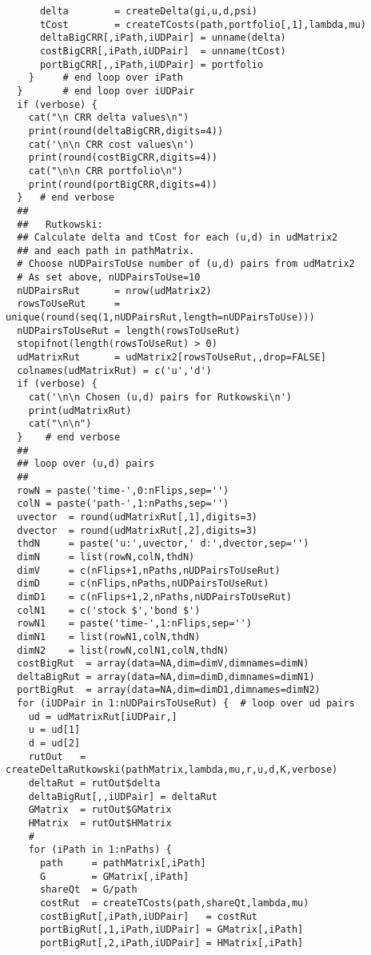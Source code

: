 \documentclass[10pt]{article}
\begin{document}
\begin{verbatim}
      delta        = createDelta(gi,u,d,psi)
      tCost        = createTCosts(path,portfolio[,1],lambda,mu)
      deltaBigCRR[,iPath,iUDPair] = unname(delta)
      costBigCRR[,iPath,iUDPair]  = unname(tCost)
      portBigCRR[,,iPath,iUDPair] = portfolio
    }     # end loop over iPath
  }       # end loop over iUDPair
  if (verbose) {
    cat("\n CRR delta values\n")
    print(round(deltaBigCRR,digits=4))
    cat('\n\n CRR cost values\n')
    print(round(costBigCRR,digits=4))
    cat("\n\n CRR portfolio\n")
    print(round(portBigCRR,digits=4))
  }   # end verbose
  ##
  ##   Rutkowski:
  ## Calculate delta and tCost for each (u,d) in udMatrix2
  ## and each path in pathMatrix.
  # Choose nUDPairsToUse number of (u,d) pairs from udMatrix2
  # As set above, nUDPairsToUse=10
  nUDPairsRut      = nrow(udMatrix2)
  rowsToUseRut     = unique(round(seq(1,nUDPairsRut,length=nUDPairsToUse)))
  nUDPairsToUseRut = length(rowsToUseRut)
  stopifnot(length(rowsToUseRut) > 0)
  udMatrixRut      = udMatrix2[rowsToUseRut,,drop=FALSE]
  colnames(udMatrixRut) = c('u','d')
  if (verbose) {
    cat('\n\n Chosen (u,d) pairs for Rutkowski\n')
    print(udMatrixRut)
    cat("\n\n")
  }    # end verbose
  ##
  ## loop over (u,d) pairs
  ##
  rowN = paste('time-',0:nFlips,sep='')
  colN = paste('path-',1:nPaths,sep='')
  uvector  = round(udMatrixRut[,1],digits=3)
  dvector  = round(udMatrixRut[,2],digits=3)
  thdN     = paste('u:',uvector,' d:',dvector,sep='')
  dimN     = list(rowN,colN,thdN)
  dimV     = c(nFlips+1,nPaths,nUDPairsToUseRut)
  dimD     = c(nFlips,nPaths,nUDPairsToUseRut)
  dimD1    = c(nFlips+1,2,nPaths,nUDPairsToUseRut)
  colN1    = c('stock $','bond $')
  rowN1    = paste('time-',1:nFlips,sep='')
  dimN1    = list(rowN1,colN,thdN)
  dimN2    = list(rowN,colN1,colN,thdN)
  costBigRut  = array(data=NA,dim=dimV,dimnames=dimN)
  deltaBigRut = array(data=NA,dim=dimD,dimnames=dimN1)
  portBigRut  = array(data=NA,dim=dimD1,dimnames=dimN2)
  for (iUDPair in 1:nUDPairsToUseRut) {  # loop over ud pairs
    ud = udMatrixRut[iUDPair,]
    u = ud[1]
    d = ud[2]
    rutOut   = createDeltaRutkowski(pathMatrix,lambda,mu,r,u,d,K,verbose)
    deltaRut = rutOut$delta
    deltaBigRut[,,iUDPair] = deltaRut
    GMatrix  = rutOut$GMatrix
    HMatrix  = rutOut$HMatrix
    #
    for (iPath in 1:nPaths) {
      path     = pathMatrix[,iPath]
      G        = GMatrix[,iPath]
      shareQt  = G/path
      costRut  = createTCosts(path,shareQt,lambda,mu)
      costBigRut[,iPath,iUDPair]   = costRut
      portBigRut[,1,iPath,iUDPair] = GMatrix[,iPath]
      portBigRut[,2,iPath,iUDPair] = HMatrix[,iPath]

\end{verbatim}
\end{document}
